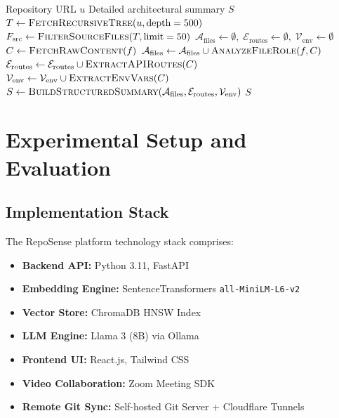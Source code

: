 \documentclass[journal]{IEEEtran}
\begin{document}
\begin{algorithm}
\caption{Deep Multi-File Repository Analysis}
\begin{algorithmic}[1]
\Require Repository URL $u$
\Ensure Detailed architectural summary $S$
\State $T \leftarrow \textsc{FetchRecursiveTree}(u, \text{depth}=500)$
\State $F_{\text{src}} \leftarrow \textsc{FilterSourceFiles}(T, \text{limit}=50)$
\State $\mathcal{A}_{\text{files}} \leftarrow \emptyset, \; \mathcal{E}_{\text{routes}} \leftarrow \emptyset, \; \mathcal{V}_{\text{env}} \leftarrow \emptyset$
    \State $C \leftarrow \textsc{FetchRawContent}(f)$
    \State $\mathcal{A}_{\text{files}} \leftarrow \mathcal{A}_{\text{files}} \cup \textsc{AnalyzeFileRole}(f, C)$
    \State $\mathcal{E}_{\text{routes}} \leftarrow \mathcal{E}_{\text{routes}} \cup \textsc{ExtractAPIRoutes}(C)$
    \State $\mathcal{V}_{\text{env}} \leftarrow \mathcal{V}_{\text{env}} \cup \textsc{ExtractEnvVars}(C)$
\EndFor
\State $S \leftarrow \textsc{BuildStructuredSummary}(\mathcal{A}_{\text{files}}, \mathcal{E}_{\text{routes}}, \mathcal{V}_{\text{env}})$
\State \Return $S$
\end{algorithmic}
\end{algorithm}

\section{Experimental Setup and Evaluation}
\label{sec:evaluation}

\subsection{Implementation Stack}

The RepoSense platform technology stack comprises:
\begin{itemize}
    \item \textbf{Backend API:} Python 3.11, FastAPI \cite{fastapi}
    \item \textbf{Embedding Engine:} SentenceTransformers \texttt{all-MiniLM-L6-v2} \cite{huggingface_st}
    \item \textbf{Vector Store:} ChromaDB HNSW Index \cite{chromadb}
    \item \textbf{LLM Engine:} Llama 3 (8B) via Ollama
    \item \textbf{Frontend UI:} React.js, Tailwind CSS
    \item \textbf{Video Collaboration:} Zoom Meeting SDK \cite{zoom_sdk}
    \item \textbf{Remote Git Sync:} Self-hosted Git Server + Cloudflare Tunnels
\end{itemize}
\end{document}
